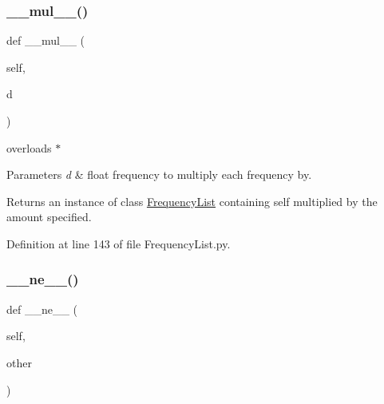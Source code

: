 \subsubsection{\texorpdfstring{\+\_\+\+\_\+mul\+\_\+\+\_\+()}{\_\_mul\_\_()}}
{\footnotesize\ttfamily def \+\_\+\+\_\+mul\+\_\+\+\_\+ (\begin{DoxyParamCaption}\item[{}]{self,  }\item[{}]{d }\end{DoxyParamCaption})}



overloads $\ast$ 


\begin{DoxyParams}{Parameters}
{\em d} & float frequency to multiply each frequency by. \\
\hline
\end{DoxyParams}
\begin{DoxyReturn}{Returns}
an instance of class \hyperlink{classSignalIntegrity_1_1FrequencyDomain_1_1FrequencyList_1_1FrequencyList}{Frequency\+List} containing self multiplied by the amount specified. 
\end{DoxyReturn}


Definition at line 143 of file Frequency\+List.\+py.

\mbox{\label{classSignalIntegrity_1_1FrequencyDomain_1_1FrequencyList_1_1FrequencyList_aa0b54a20b36fcc55e1147de88d083072}} 
\subsubsection{\texorpdfstring{\+\_\+\+\_\+ne\+\_\+\+\_\+()}{\_\_ne\_\_()}}
{\footnotesize\ttfamily def \+\_\+\+\_\+ne\+\_\+\+\_\+ (\begin{DoxyParamCaption}\item[{}]{self,  }\item[{}]{other }\end{DoxyParamCaption})}



